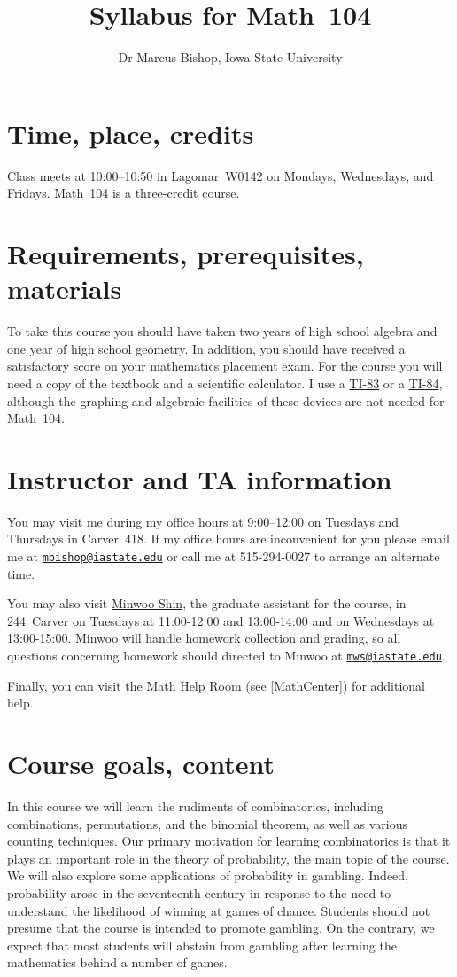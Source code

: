 \documentclass[11pt]{article}
\title{Syllabus for Math~104}
\author{Dr Marcus Bishop, Iowa State University}
\begin{document}
\maketitle

\section{Time, place, credits}\label{Time} Class meets at 10:00--10:50
in Lagomar~W0142 on Mondays, Wednesdays, and Fridays.
Math~104 is a three-credit course.

\section{Requirements, prerequisites, materials}
To take this course you should have taken two
years of high school algebra and one year of high school geometry.
In addition, you should
have received a satisfactory score on your mathematics placement exam.
For the course you will need a copy of the textbook
and a scientific calculator.
I use a \href{http://en.wikipedia.org/wiki/TI-83}{TI-83} or a
\href{http://en.wikipedia.org/wiki/TI-84}{TI-84}, although
the graphing and algebraic facilities of these devices are
not needed for Math~104.

\section{Instructor and TA information} You may visit me during my office 
hours at 9:00--12:00 on Tuesdays and Thursdays
in Carver~418. If my office hours are inconvenient for you
please email me at 
\href{mailto:mbishop@iastate.edu}{\tt mbishop@iastate.edu} or call me at 
515-294-0027 to arrange an alternate time.

You may also visit
\href{mailto:mws@iastate.edu}{Minwoo Shin},
the graduate assistant for the course,
in 244~Carver on Tuesdays at 11:00-12:00 and 13:00-14:00
and on Wednesdays at 13:00-15:00.
Minwoo will handle homework collection and grading, so all questions
concerning homework should directed to Minwoo at
\href{mailto:mws@iastate.edu}{\tt mws@iastate.edu}.

Finally, you can visit the Math Help Room (see \autoref{MathCenter})
for additional help.

\section{Course goals, content}
In this course we will learn the rudiments of combinatorics,
including combinations, permutations, and the binomial theorem,
as well as various counting techniques.
Our primary motivation for learning combinatorics is that it
plays an important role in the theory of probability, the main
topic of the course. We will also explore some
applications of probability in gambling. Indeed, probability
arose in the seventeenth century in response to the need
to understand the likelihood of winning at games of chance.
Students should not presume that the course is intended to
promote gambling. On the contrary, we expect that most
students will abstain from gambling after learning the mathematics
behind a number of games.
\end{document}
